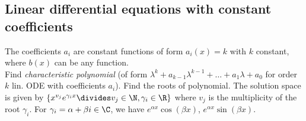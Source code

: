 \newsectionNoPB
\subsection{Linear differential equations with constant coefficients}
The coefficients $a_i$ are constant functions of form $a_i(x) = k$ with $k$ constant, where $b(x)$ can be any function.\\
%
 Find \textit{characteristic polynomial} (of form $\lambda^k + a_{k - 1} \lambda^{k - 1} + \ldots + a_1 \lambda + a_0$ for order $k$ lin. ODE with coefficients $a_i$).
Find the roots of polynomial. The solution space is given by $\{ x^{v_j} e^{\gamma_i x} \divides v_j \in \N, \gamma_i \in \R \}$ where $v_j$ is the multiplicity of the root $\gamma_i$.
For $\gamma_i = \alpha + \beta i \in \C$, we have $e^{\alpha x}\cos(\beta x)$, $e^{\alpha x}\sin(\beta x)$.
